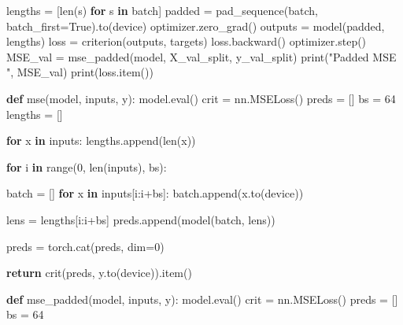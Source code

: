 \documentclass[
  letterpaper,
  DIV=11,
  numbers=noendperiod]{scrartcl}
\newenvironment{Shaded}{\begin{snugshade}}{\end{snugshade}}
\newcommand{\BuiltInTok}[1]{\textcolor[rgb]{0.00,0.23,0.31}{#1}}
\newcommand{\ControlFlowTok}[1]{\textcolor[rgb]{0.00,0.23,0.31}{\textbf{#1}}}
\newcommand{\DecValTok}[1]{\textcolor[rgb]{0.68,0.00,0.00}{#1}}
\newcommand{\KeywordTok}[1]{\textcolor[rgb]{0.00,0.23,0.31}{\textbf{#1}}}
\newcommand{\NormalTok}[1]{\textcolor[rgb]{0.00,0.23,0.31}{#1}}
\newcommand{\OperatorTok}[1]{\textcolor[rgb]{0.37,0.37,0.37}{#1}}
\newcommand{\StringTok}[1]{\textcolor[rgb]{0.13,0.47,0.30}{#1}}
\newcommand{\VariableTok}[1]{\textcolor[rgb]{0.07,0.07,0.07}{#1}}
\begin{document}
\begin{Shaded}
\begin{Highlighting}[]
\NormalTok{            lengths }\OperatorTok{=}\NormalTok{ [}\BuiltInTok{len}\NormalTok{(s) }\ControlFlowTok{for}\NormalTok{ s }\KeywordTok{in}\NormalTok{ batch]}
\NormalTok{            padded }\OperatorTok{=}\NormalTok{ pad\_sequence(batch, batch\_first}\OperatorTok{=}\VariableTok{True}\NormalTok{).to(device)}
\NormalTok{            optimizer.zero\_grad()}
\NormalTok{            outputs }\OperatorTok{=}\NormalTok{ model(padded, lengths)}
\NormalTok{            loss }\OperatorTok{=}\NormalTok{ criterion(outputs, targets)}
\NormalTok{            loss.backward()}
\NormalTok{            optimizer.step()}
\NormalTok{        MSE\_val }\OperatorTok{=}\NormalTok{ mse\_padded(model, X\_val\_split, y\_val\_split)}
        \BuiltInTok{print}\NormalTok{(}\StringTok{"Padded MSE "}\NormalTok{, MSE\_val)}
        \BuiltInTok{print}\NormalTok{(loss.item())}


\KeywordTok{def}\NormalTok{ mse(model, inputs, y):}
\NormalTok{    model.}\BuiltInTok{eval}\NormalTok{()}
\NormalTok{    crit }\OperatorTok{=}\NormalTok{ nn.MSELoss()}
\NormalTok{    preds }\OperatorTok{=}\NormalTok{ []}
\NormalTok{    bs }\OperatorTok{=} \DecValTok{64}
\NormalTok{    lengths }\OperatorTok{=}\NormalTok{ []}

    \ControlFlowTok{for}\NormalTok{ x }\KeywordTok{in}\NormalTok{ inputs:}
\NormalTok{        lengths.append(}\BuiltInTok{len}\NormalTok{(x))}

    \ControlFlowTok{for}\NormalTok{ i }\KeywordTok{in} \BuiltInTok{range}\NormalTok{(}\DecValTok{0}\NormalTok{, }\BuiltInTok{len}\NormalTok{(inputs), bs):}

\NormalTok{        batch }\OperatorTok{=}\NormalTok{ []}
        \ControlFlowTok{for}\NormalTok{ x }\KeywordTok{in}\NormalTok{ inputs[i:i}\OperatorTok{+}\NormalTok{bs]:}
\NormalTok{            batch.append(x.to(device))}

\NormalTok{        lens  }\OperatorTok{=}\NormalTok{ lengths[i:i}\OperatorTok{+}\NormalTok{bs]}
\NormalTok{        preds.append(model(batch, lens))}

\NormalTok{    preds }\OperatorTok{=}\NormalTok{ torch.cat(preds, dim}\OperatorTok{=}\DecValTok{0}\NormalTok{)}

    \ControlFlowTok{return}\NormalTok{ crit(preds, y.to(device)).item()}



\KeywordTok{def}\NormalTok{ mse\_padded(model, inputs, y):}
\NormalTok{    model.}\BuiltInTok{eval}\NormalTok{()}
\NormalTok{    crit }\OperatorTok{=}\NormalTok{ nn.MSELoss()}
\NormalTok{    preds }\OperatorTok{=}\NormalTok{ []}
\NormalTok{    bs }\OperatorTok{=} \DecValTok{64}


\end{Highlighting}
\end{Shaded}
\end{document}
